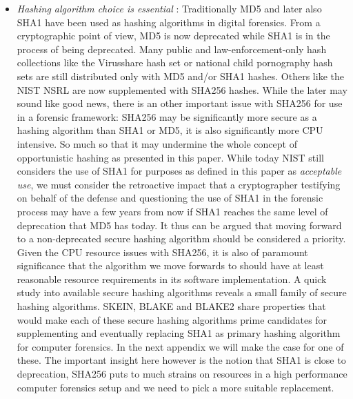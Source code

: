 \begin{itemize}
\item \emph{Hashing algorithm choice is essential} :  Traditionally MD5 and later also SHA1 have been used as hashing algorithms in digital forensics. From a cryptographic point of view, MD5 is now deprecated while SHA1 is in the process of being deprecated. Many public and law-enforcement-only hash collections like the Virusshare hash set or national child pornography hash sets are still distributed only with MD5 and/or SHA1 hashes. Others like the NIST NSRL are now supplemented with SHA256 hashes. While the later may sound like good news, there is an other important issue with SHA256 for use in a forensic framework: SHA256 may be significantly more secure as a hashing algorithm than SHA1 or MD5, it is also significantly more CPU intensive. So much so that it may undermine the whole concept of opportunistic hashing as presented in this paper. While today NIST still considers the use of SHA1 for purposes as defined in this paper as \emph{acceptable use}, we must consider the retroactive impact that a cryptographer testifying on behalf of the defense and questioning the use of SHA1 in the forensic process may have a few years from now if SHA1 reaches the same level of deprecation that MD5 has today. It thus can be argued that moving forward to a non-deprecated secure hashing algorithm should be considered a priority. Given the CPU resource issues with SHA256, it is also of paramount significance that the algorithm we move forwards to should have at least reasonable resource requirements in its software implementation. A quick study into available secure hashing algorithms reveals a small family of secure hashing algorithms. SKEIN, BLAKE and BLAKE2 share properties that would make each of these secure hashing algorithms prime candidates for supplementing and eventually replacing SHA1 as primary hashing algorithm for computer forensics. In the next appendix we will make the case for one of these. The important insight here however is the notion that SHA1 is close to deprecation, SHA256 puts to much strains on resources in a high performance computer forensics setup and we need to pick a more suitable replacement.     
\end{itemize}
